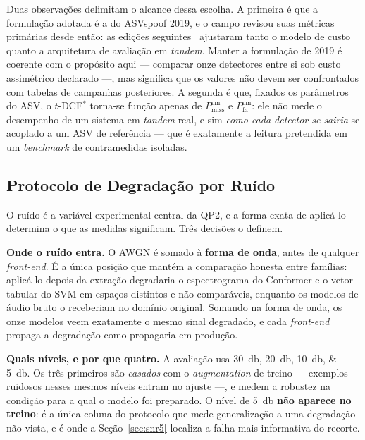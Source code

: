 \documentclass[12pt,a4paper]{article}
\begin{document}
Duas observações delimitam o alcance dessa escolha. A primeira é que a
formulação adotada é a do ASVspoof 2019, e o campo revisou suas métricas
primárias desde então: as edições seguintes~\cite{yamagishi2021asvspoof,
	wang2024asvspoof5} ajustaram tanto o modelo de custo quanto a arquitetura de
avaliação em \textit{tandem}. Manter a formulação de 2019 é coerente com o
propósito aqui --- comparar onze detectores entre si sob custo assimétrico
declarado ---, mas significa que os valores não devem ser confrontados com
tabelas de campanhas posteriores. A segunda é que, fixados os parâmetros do
ASV, o $t$-DCF$^\ast$ torna-se função apenas de $P_{\text{miss}}^{\text{cm}}$ e
$P_{\text{fa}}^{\text{cm}}$: ele não mede o desempenho de um sistema em
\textit{tandem} real, e sim \emph{como cada detector se sairia} se acoplado a
um ASV de referência --- que é exatamente a leitura pretendida em um
\textit{benchmark} de contramedidas isoladas.

\subsection{Protocolo de Degradação por Ruído}
\label{sec:protocolo_ruido}

O ruído é a variável experimental central da QP2, e a forma exata de aplicá-lo
determina o que as medidas significam. Três decisões o definem.

\textbf{Onde o ruído entra.} O AWGN é somado à \textbf{forma de onda}, antes de
qualquer \textit{front-end}. É a única posição que mantém a comparação
honesta entre famílias: aplicá-lo depois da extração degradaria o espectrograma
do Conformer e o vetor tabular do SVM em espaços distintos e não comparáveis,
enquanto os modelos de áudio bruto o receberiam no domínio original. Somando na
forma de onda, os onze modelos veem exatamente o mesmo sinal degradado, e cada
\textit{front-end} propaga a degradação como propagaria em produção.

\textbf{Quais níveis, e por que quatro.} A avaliação usa
\SIlist{30;20;10;5}{\decibel}. Os três primeiros são \emph{casados} com o
\textit{augmentation} de treino --- exemplos ruidosos nesses mesmos níveis
entram no
ajuste ---, e medem a robustez na condição para a qual o modelo foi preparado.
O nível de \SI{5}{\decibel} \textbf{não aparece no treino}: é a única coluna do
protocolo que mede generalização a uma degradação não vista, e é onde a
Seção~\ref{sec:snr5} localiza a falha mais informativa do recorte.
\end{document}
